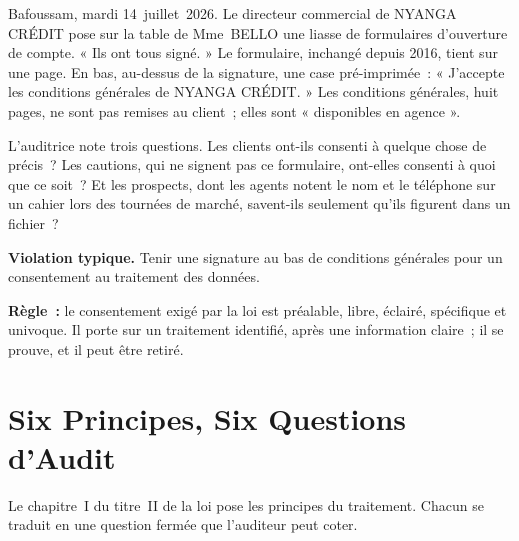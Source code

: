 Bafoussam, mardi 14~juillet~2026. Le directeur commercial de NYANGA CRÉDIT
pose sur la table de Mme~BELLO une liasse de formulaires d'ouverture de
compte. « Ils ont tous signé. » Le formulaire, inchangé depuis 2016, tient
sur une page. En bas, au-dessus de la signature, une case pré-imprimée~:
« J'accepte les conditions générales de NYANGA CRÉDIT. » Les conditions
générales, huit pages, ne sont pas remises au client~; elles sont
« disponibles en agence ».

L'auditrice note trois questions. Les clients ont-ils consenti à quelque
chose de précis~? Les cautions, qui ne signent pas ce formulaire, ont-elles
consenti à quoi que ce soit~? Et les prospects, dont les agents notent le
nom et le téléphone sur un cahier lors des tournées de marché, savent-ils
seulement qu'ils figurent dans un fichier~?

\begin{boxalert}
\textbf{Violation typique.} Tenir une signature au bas de conditions
générales pour un consentement au traitement des données.

\smallskip
\textbf{Règle~:} le consentement exigé par la loi est préalable, libre,
éclairé, spécifique et univoque. Il porte sur un traitement identifié, après
une information claire~; il se prouve, et il peut être retiré.
\end{boxalert}

\section{Six Principes, Six Questions d'Audit}
\label{sec:c02-principes}

Le chapitre~I du titre~II de la loi pose les principes du traitement. Chacun
se traduit en une question fermée que l'auditeur peut coter.

